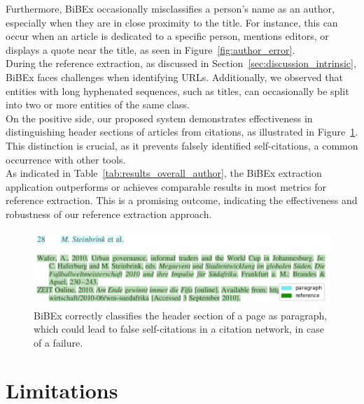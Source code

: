 Furthermore, BiBEx occasionally misclassifies a person's name as an author, especially when they are in close proximity to the title. For instance, this can occur when an article is dedicated to a specific person, mentions editors, or displays a quote near the title, as seen in Figure~\ref{fig:author_error}.\\
During the reference extraction, as discussed in Section~\ref{sec:discussion_intrinsic}, BiBEx faces challenges when identifying URLs. Additionally, we observed that entities with long hyphenated sequences, such as titles, can occasionally be split into two or more entities of the same class.\\
On the positive side, our proposed system demonstrates effectiveness in distinguishing header sections of articles from citations, as illustrated in Figure~\ref{fig:ref_header}. This distinction is crucial, as it prevents falsely identified self-citations, a common occurrence with other tools.\\
As indicated in Table~\ref{tab:results_overall_author}, the BiBEx extraction application outperforms or achieves comparable results in most metrics for reference extraction. This is a promising outcome, indicating the effectiveness and robustness of our reference extraction approach.

\begin{figure}[!t]
    \centering
    \includegraphics[width=0.9\linewidth]{images/header.png}
    \caption{BiBEx correctly classifies the header section of a page as paragraph, which could lead to false self-citations in a citation network, in case of a failure.}
    \label{fig:ref_header}
\end{figure}

\section{Limitations}\label{sec:discussion_limitations}

